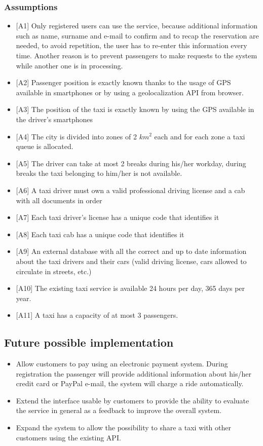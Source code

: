 \documentclass[a4paper,12pt]{article}%
\begin{document}
\subsubsection{Assumptions}
\begin{itemize}
\label{a1} \item {[}A1{]} Only registered users can use the service, because additional information such as name, surname and e-mail to confirm and to recap the reservation are needed, to avoid repetition, the user has to re-enter this information every time.
Another reason is to prevent passengers to make requests to the system while another one is in processing.
\label{a2} \item {[}A2{]} Passenger position is exactly known thanks to the usage of GPS available in smartphones or by using a geolocalization API from browser. 
\label{a3} \item {[}A3{]} The position of the taxi is exactly known by using the GPS available in the driver's smartphones
\label{a4} \item {[}A4{]} The city is divided into zones of 2 $km^2$ each and for each zone a taxi queue is allocated.
\label{a5} \item {[}A5{]} The driver can take at most 2 breaks during his/her workday, during breaks the taxi belonging to him/her is not available.
\label{a6} \item {[}A6{]} A taxi driver must own a valid professional driving license and a cab with all documents in order
\label{a7} \item {[}A7{]} Each taxi driver's license has a unique code that identifies it
\label{a8} \item {[}A8{]} Each taxi cab has a unique code that identifies it
\label{a9} \item {[}A9{]} An external database with all the correct and up to date information about the taxi drivers and their cars (valid driving license, cars allowed to circulate in streets, etc.)
\label{a10} \item {[}A10{]} The existing taxi service is available 24 hours per day, 365 days per year.
\label{a11} \item {[}A11{]} A taxi has a capacity of at most 3 passengers. 
\end{itemize}
\subsection{Future possible implementation}
\begin{itemize}
\item Allow customers to pay using an electronic payment system. During registration the passenger will provide additional information about his/her credit card or PayPal e-mail, the system will charge a ride automatically.
\item Extend the interface usable by customers to provide the ability to evaluate the service in general as a feedback to improve the overall system.
\item Expand the system to allow the possibility to share a taxi with other customers using the existing API.
\end{itemize}
\newpage
\end{document}
